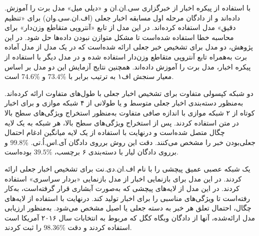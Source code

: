 \citet{jwa2019exbake} .با استفاده از پیکره اخبار از خبرگزاری سی.ان.ان و  «دیلی میل» مدل برت را آموزش داده‌اند و از دادگان مرحله اول مسابقه اخبار جعلی (اف.ان.سی.وان) برای «تنظیم دقیق» مدل استفاده کرده‌اند. در این مدل از تابع «آنتروپی متقاطع وزن‌دار» برای محاسبه خطا استفاده شده‌است تا مشکل متوازن نبودن داده‌ها حل شود. در این پژوهش، دو مدل برای تشخیص خبر جعلی ارائه شده‌است که در یک مدل از مدل آماده برت به‌همراه تابع آنتروپی متقاطع وزن‌دار استفاده شده و در مدل دیگر با استفاده از پیکره اخبار، مدل برت را آموزش داده‌اند. همچنین نتایج آزمایش این دو مدل بر اساس معیار سنجش اف۱ به ترتیب برابر با  \%$73.4$ و \%$74.6$ است.

\cite{goldani2020detecting} دو شبکه کپسولی متفاوت برای تشخیص اخبار جعلی با طول‌های متفاوت ارائه کرده‌اند. به‌منظور دسته‌بندی اخبار جعلی متوسط و یا طولانی از ۴ شبکه موازی و برای اخبار کوتاه از ۲ شبکه موازی با اندازه صافی  متفاوت به‌منظور استخراج ویژگی‌های سطح بالا در متن استفاده کردند. پس از استخراج ویژگی‌های سطح بالا، هر شبکه به یک لایه چگال متصل شده‌است و درنهایت با استفاده از یک لایه میانگین ادغام احتمال جعلی‌بودن خبر را مشخص می‌کنند. دقت این روش برروی دادگان آی.اس.اُ.تی.
\%$99.8$
و برروی دادگان لیار با دسته‌بندی ۶ برچسب، \%$39.5$ بوده‌است.

\citet{kaliyar2020fndnet} یک شبکه عصبی عمیق پیچشی را با نام اف.ان.دی.نت برای تشخیص اخبار جعلی ارائه کردند. در این مدل برای بازنمایی اخبار از مدل بازنمایی «بردار سراسری»  \citep{pennington2014glove} استفاده کردند. در این مدل از لایه‌های پیچشی که به‌صورت آبشاری قرار گرفته‌است، به‌کار رفته‌است تا ویژگی‌های مناسبی را برای اخبار تولید کند. درنهایت با استفاده از لایه‌های چگال، احتمال تعلق هر خبر به دسته جعلی یا اصیل مشخص می‌شود. به‌منظور ارزیابی مدل ارائه‌شده، آنها از دادگان وبگاه کگل که مربوط به انتخابات سال ۲۰۱۶ آمریکا است استفاده کردند و دقت \%$98.36$ را ثبت کردند.
 
